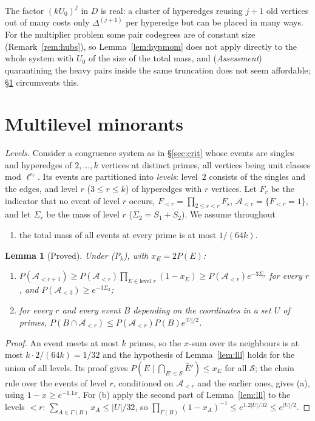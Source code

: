 \documentclass[11pt,reqno]{amsart}
\newtheorem{lemma}[theorem]{Lemma}
\theoremstyle{definition}
\begin{document}
The factor $(kU_0)^j$ in $D$ is real: a cluster of hyperedges reusing $j+1$
old vertices out of many costs only $\Delta^{(j+1)}$ per hyperedge but can be
placed in many ways.  For the multiplier problem some pair codegrees are of
constant size (Remark~\ref{rem:hubs}), so Lemma~\ref{lem:hypmom} does not
apply directly to the whole system with $U_0$ of the size of the total mass,
and (\emph{Assessment}) quarantining the heavy pairs inside the same
truncation does not seem affordable; \S\ref{sec:multi} circumvents this.

\section{Multilevel minorants}\label{sec:multi}

\emph{Levels.}  Consider a congruence system as in \S\ref{sec:crit} whose
events are singles and hyperedges of $2,\dots,k$ vertices at distinct primes,
all vertices being unit classes mod $\ell^{e_\ell}$.  Its events are
partitioned into \emph{levels}: level~$2$ consists of the singles and the
edges, and level $r$ ($3\le r\le k$) of hyperedges with $r$ vertices.  Let
$F_r$ be the indicator that no event of level $r$ occurs, $F_{<r}=\prod_{2\le
s<r}F_s$, $\mathcal A_{<r}=\{F_{<r}=1\}$, and let $\Sigma_r$ be the mass of level
$r$ ($\Sigma_2=S_1+S_2$).  We assume throughout
\begin{enumerate}
\item[(P$_k$)] the total mass of all events at every prime is at most $1/(64k)$.
\end{enumerate}

\begin{lemma}[Proved]\label{lem:compare}
Under \textup{(P$_k$)}, with $x_E=2P(E)$:
\begin{enumerate}
\item[(a)] $P(\mathcal A_{<r+1})\ge P(\mathcal A_{<r})\prod_{E\in\text{level }r}(1-x_E)\ge P(\mathcal A_{<r})e^{-3\Sigma_r}$ for every $r$, and $P(\mathcal A_{<3})\ge e^{-3\Sigma_2}$;
\item[(b)] for every $r$ and every event $B$ depending on the coordinates in a
set $U$ of primes, $P(B\cap\mathcal A_{<r})\le P(\mathcal A_{<r})P(B)e^{|U|/2}$.
\end{enumerate}
\end{lemma}

\begin{proof}
An event meets at most $k$ primes, so the $x$-sum over its neighbours is at
most $k\cdot2/(64k)=1/32$ and the hypothesis of Lemma~\ref{lem:lll} holds for
the union of all levels.  Its proof gives $P(E\mid\bigcap_{E'\in\mathcal S}\bar E')\le
x_E$ for all $\mathcal S$; the chain rule over the events of level $r$, conditioned
on $\mathcal A_{<r}$ and the earlier ones, gives (a), using $1-x\ge e^{-1.1x}$.
For (b) apply the second part of Lemma~\ref{lem:lll} to the levels $<r$:
$\sum_{A\in\Gamma(B)}x_A\le|U|/32$, so
$\prod_{\Gamma(B)}(1-x_A)^{-1}\le e^{1.2|U|/32}\le e^{|U|/2}$.
\end{proof}
\end{document}

